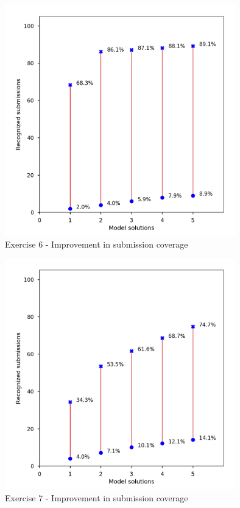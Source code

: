 \begin{figure}
\centering
\includegraphics[height=10cm]{graphs/coverage-6.png}
\caption{Exercise 6 - Improvement in submission coverage}
\label{fig:improvements-coverage-6}
\end{figure}

\begin{figure}
\centering
\includegraphics[height=10cm]{graphs/coverage-7.png}
\caption{Exercise 7 - Improvement in submission coverage}
\label{fig:improvements-coverage-7}
\end{figure}

